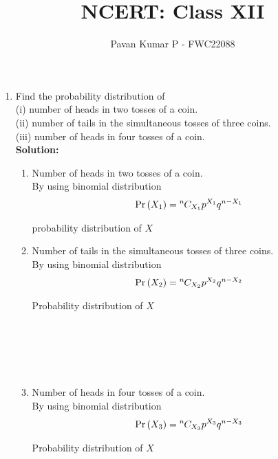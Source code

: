 \documentclass{article}
\providecommand{\pr}[1]{\ensuremath{\Pr\left(#1\right)}}
\newcommand{\solution}{\noindent \textbf{Solution: }}
\newcommand*{\permcomb}[4][0mu]{{{}^{#3}\mkern#1#2_{#4}}}
\newcommand*{\comb}[1][-1mu]{\permcomb[#1]{C}}
\begin{document}
\title{NCERT: Class XII}
\author{\Large Pavan Kumar P - FWC22088}
\date{}

\maketitle

\begin{enumerate}[label=13.\arabic{enumi}.\arabic{enumii}]

\setcounter{enumi}{3}
\setcounter{enumii}{4}

\item Find the probability distribution of\\
(i) number of heads in two tosses of a coin.\\
(ii) number of tails in the simultaneous tosses of three coins.\\
(iii) number of heads in four tosses of a coin.\\[1ex]
\solution
\begin{enumerate}

  \begin{table}[h]
 \centering
	
	\caption{Variable Description }
\end{table}
\item Number of heads in two tosses of a coin.\\
 By using binomial distribution
 \begin{align}
 \pr{X_1} = \comb{n}{X_1}p^{X_1}q^{n-X_1}
 \end{align}
 \begin{table}[h]
 \centering
	
	\caption{probability distribution of $X$}
\end{table}

\item Number of tails in the simultaneous tosses of three coins.\\
 By using binomial distribution\\
 \begin{align}
 \pr{X_2} = \comb{n}{X_2}p^{X_2}q^{n-X_2}
 \end{align}
  \begin{table}[h]
 \centering
	
	\caption{Probability distribution of $X$}
\end{table}
\\\\\\\\
\item Number of heads in four tosses of a coin.\\
 By using binomial distribution\\
 \begin{align}
 \pr{X_3} = \comb{n}{X_3}p^{X_3}q^{n-X_3}
 \end{align}
  \begin{table}[h]
 \centering
	
	\caption{Probability distribution of $X$}
\end{table}

\end{enumerate}
\end{enumerate}
\end{document}

